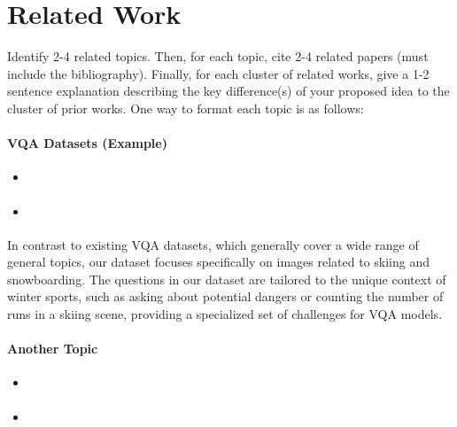 \section{Related Work}

Identify 2-4 related topics. Then, for each topic, cite 2-4 related papers (must include the bibliography). Finally, for each cluster of related works, give a 1-2 sentence explanation describing the key difference(s) of your proposed idea to the cluster of prior works. One way to format each topic is as follows:

\paragraph{VQA Datasets (Example)}
\begin{itemize}
    \item \cite{antol2015vqa}
    \item \cite{gurari2018vizwiz}
\end{itemize}
In contrast to existing VQA datasets, which generally cover a wide range of general topics, our dataset focuses specifically on images related to skiing and snowboarding. The questions in our dataset are tailored to the unique context of winter sports, such as asking about potential dangers or counting the number of runs in a skiing scene, providing a specialized set of challenges for VQA models.


\paragraph{Another Topic}
\begin{itemize}
    \item \cite{fjiaep}
    \item \cite{fjiaep}
\end{itemize}